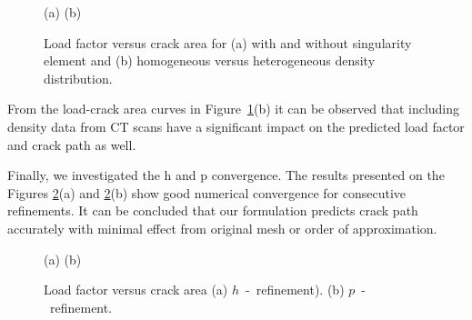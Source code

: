 \documentclass[review]{elsarticle}
\numberwithin{equation}{section}
\begin{document}
\begin{figure}[h]
	\centering
	\begin{minipage}{.45\textwidth}
		\hspace{-1cm}
\end{minipage}%
\quad
\begin{minipage}{.45\textwidth}
\end{minipage}

(a) \hspace{6cm} (b)
	\caption{Load factor versus crack area for (a) with and without singularity element and (b) homogeneous versus heterogeneous density distribution.}
	\label{fig:load_factor1}
\end{figure}
From the load-crack area curves in Figure~\ref{fig:load_factor1}(b) it can be observed that including density data from CT scans have a significant impact on the predicted load factor and crack path as well. 


Finally, we investigated the h and p convergence. The results presented on the Figures \ref{fig:load_factor2}(a) and \ref{fig:load_factor2}(b) show good numerical convergence for consecutive refinements. It can be concluded that our formulation predicts crack path accurately with minimal effect from original mesh or order of approximation. 

\begin{figure}
	\centering
	\begin{minipage}{.5\textwidth}
	\end{minipage}%
	\begin{minipage}{.5\textwidth}
	\end{minipage}
	
	(a)\hspace{5cm} (b)
			 \caption{Load factor versus crack area (a) $h$~-~refinement). (b) $p$~-~refinement.}
		 \label{fig:load_factor2}
	\end{figure}
\end{document}
